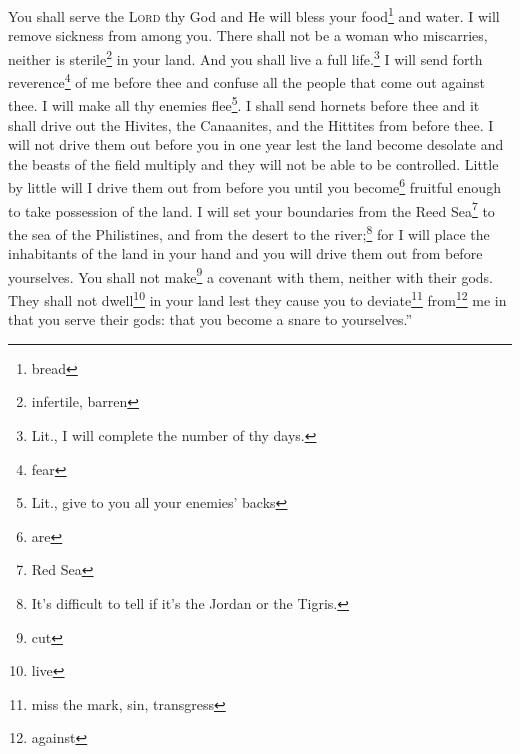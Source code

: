 \begin{enumerate}[align=center]
     You shall serve the \textsc{Lord} thy God and He will bless your food\footnote{bread} and water. I will remove sickness from among you.%
     There shall not be a woman who miscarries, neither is sterile\footnote{infertile, barren} in your land. And you shall live a full life.\footnote{Lit., I will complete the number of thy days.}%
     I will send forth reverence\footnote{fear} of me before thee and confuse all the people that come out against thee. I will make all thy enemies flee\footnote{Lit., give to you all your enemies' backs}.%
     I shall send hornets before thee and it shall drive out the Hivites, the Canaanites, and the Hittites from before thee.%
     I will not drive them out before you in one year lest the land become desolate and the beasts of the field multiply and they will not be able to be controlled.%
     Little by little will I drive them out from before you until you become\footnote{are} fruitful enough to take possession of the land.%
     I will set your boundaries from the Reed Sea\footnote{Red Sea} to the sea of the Philistines, and from the desert to the river;\footnote{It's difficult to tell if it's the Jordan or the Tigris.} for I will place the inhabitants of the land in your hand and you will drive them out from before yourselves.%
     You shall not make\footnote{cut} a covenant with them, neither with their gods.%
     They shall not dwell\footnote{live} in your land lest they cause you to deviate\footnote{miss the mark, sin, transgress} from\footnote{against} me in that you serve their gods: that you become a snare to yourselves.''%
\end{enumerate}
